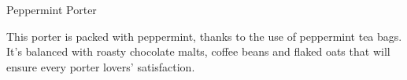 \begin{recipe}{Peppermint Porter}

\begin{aboutblock}
This porter is packed with peppermint, thanks to the use of peppermint tea bags.
It's balanced with roasty chocolate malts, coffee beans and flaked oats that
will ensure every porter lovers' satisfaction. 
\end{aboutblock}


\begin{methodandtiming}
 
\begin{mashsteps}
\end{mashsteps}

\begin{fermentationsteps}
\end{fermentationsteps}

\end{methodandtiming}

\recipebreak

\begin{ingredientsblock}

\begin{malts}
\end{malts}

\begin{hops}

\end{hops}


\begin{twists}
\end{twists}

\end{ingredientsblock}

\end{recipe}